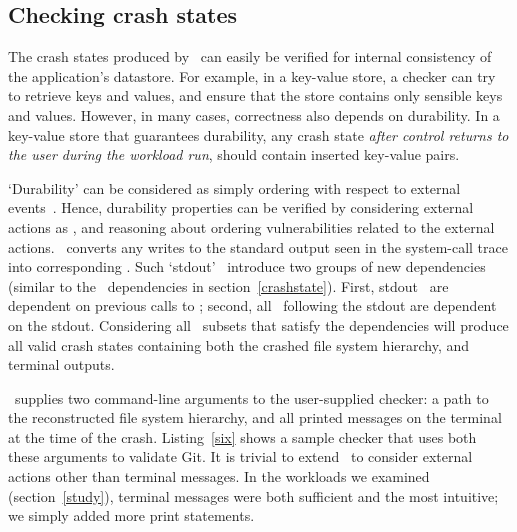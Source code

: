 \subsection{Checking crash states}
\label{checker}
The crash states produced by \Kassandra\ can easily be verified for internal consistency of the application's datastore. For example, in a key-value store, a checker can try to retrieve keys and values, and ensure that the store contains only sensible keys and values. However, in many cases, correctness also depends on durability. In a key-value store that guarantees durability, any crash state {\it after control returns to the user during the workload run}, should contain inserted key-value pairs.

`Durability' can be considered as simply ordering with respect to external events~\cite{Nightingale06-Rethink}. Hence, durability properties can be verified by considering external actions as \microinstructions, and reasoning about ordering vulnerabilities related to the external actions. \Kassandra\ converts any writes to the standard output seen in the system-call trace into corresponding \microinstructions. Such `stdout' \microinstructions\ introduce two groups of new dependencies (similar to the \fsyncSC\ dependencies in section~\ref{crashstate}). First, stdout \microinstructions\ are dependent on previous calls to \fsyncSC; second, all \microinstructions\ following the stdout are dependent on the stdout. Considering all \microinstruction\ subsets that satisfy the dependencies will produce all valid crash states containing both the crashed file system hierarchy, and terminal outputs.



\Kassandra\ supplies two command-line arguments to the user-supplied checker: a path to the reconstructed file system hierarchy, and all printed messages on the terminal at the time of the crash. Listing~\ref{six} shows a sample checker that uses both these arguments to validate Git. It is trivial to extend \Kassandra\ to consider external actions other than terminal messages. In the workloads we examined (section~\ref{study}), terminal messages were both sufficient and the most intuitive; we simply added more print statements.

